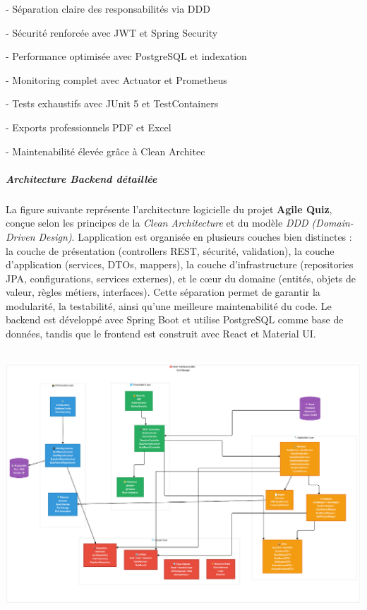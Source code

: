 \documentclass[12pt,a4paper,twoside,openright]{report}
\begin{document}
- Séparation claire des responsabilités via DDD

- Sécurité renforcée avec JWT et Spring Security

- Performance optimisée avec PostgreSQL et indexation

- Monitoring complet avec Actuator et Prometheus

- Tests exhaustifs avec JUnit 5 et TestContainers

- Exports professionnels PDF et Excel

- Maintenabilité élevée grâce à Clean Architec

\hypertarget{architecture-backend-duxe9tailluxe9e}{%
\subparagraph{\texorpdfstring{\textbf{Architecture Backend
détaillée}}{Architecture Backend détaillée}}\label{architecture-backend-duxe9tailluxe9e}}

La figure suivante représente l'architecture logicielle du projet
\textbf{Agile Quiz}, conçue selon les principes de la \emph{Clean
Architecture} et du modèle \emph{DDD (Domain-Driven Design)}.
L\textquotesingle application est organisée en plusieurs couches bien
distinctes : la couche de présentation (controllers REST, sécurité,
validation), la couche d'application (services, DTOs, mappers), la
couche d'infrastructure (repositories JPA, configurations, services
externes), et le cœur du domaine (entités, objets de valeur, règles
métiers, interfaces). Cette séparation permet de garantir la modularité,
la testabilité, ainsi qu'une meilleure maintenabilité du code. Le
backend est développé avec Spring Boot et utilise PostgreSQL comme base
de données, tandis que le frontend est construit avec React et Material
UI.

\includegraphics[width=5.80486in,height=3.92639in]{latex_media/media/image48.png}
\end{document}
